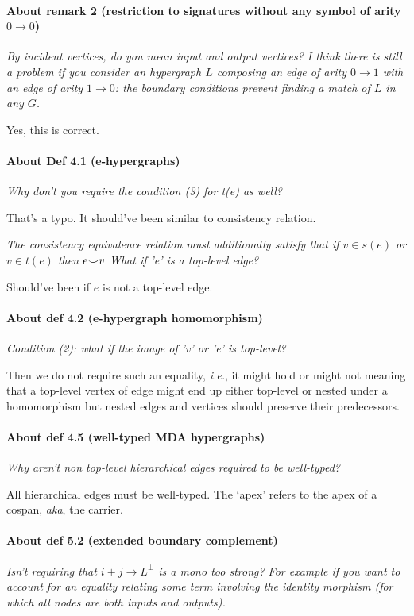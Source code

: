 \documentclass{article}
\begin{document}
\paragraph{About remark 2 (restriction to signatures without any symbol of arity $0 \to 0$)}
\textit{By incident vertices, do you mean input and output vertices? I think there is
still a problem if you consider an hypergraph $L$ composing an edge of arity $0 \to
1$ with an edge of arity $1 \to 0$: the boundary conditions prevent finding a match
of $L$ in any $G$.}

Yes, this is correct.

\paragraph{About Def 4.1 (e-hypergraphs)}
\textit{Why don't you require the condition (3) for t(e) as well?}

That's a typo. It should've been similar to consistency relation.

\textit{The consistency equivalence relation must additionally satisfy that if $v \in s(e)$ or $v \in t(e)$ then $e {\smile} v$}
\textit{What if 'e' is a top-level edge?}

Should've been if $e$ is not a top-level edge.

\paragraph{About def 4.2 (e-hypergraph homomorphism)}

\textit{Condition (2): what if the image of 'v' or 'e' is top-level?}

Then we do not require such an equality, \textit{i.e.}, it might hold or might not meaning that a top-level vertex of edge might end up either top-level or nested under a homomorphism but nested edges and vertices should preserve their predecessors.

\paragraph{About def 4.5 (well-typed MDA hypergraphs)}
\textit{Why aren't non top-level hierarchical edges required to be well-typed?}

All hierarchical edges must be well-typed. The `apex' refers to the apex of a cospan, \textit{aka}, the carrier.

\paragraph{About def 5.2 (extended boundary complement)}
\textit{Isn't requiring that $i+j \to L^\bot$ is a mono too strong? For example if you
want to account for an equality relating some term involving the identity
morphism (for which all nodes are both inputs and outputs).}
\end{document}

